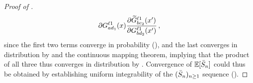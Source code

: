 \begin{proof}[Proof of ]
\begin{align}
{        }{
            \partial
            G_{ad_1}^{\ell1}(x)
        }
        \frac{
            \partial
            \widetilde{G}_{b c_2}^{\ell 1} (x')
        }{
            \partial
            G_{b d_2}^{\ell 1}(x')
        }
        \, ,
    \end{align}
    since the first two terms converge in probability (), and the last converges in distribution by  and the continuous mapping theorem, implying that the product of all three thus converges in distribution by .
    Convergence of $\operatorname*{\mathbb{E}} [\bar{S}_{n}]$ could thus be obtained by establishing uniform integrability of the $(\bar{S}_{n})_{n \geq 1}$ sequence ().
    

\end{proof}
